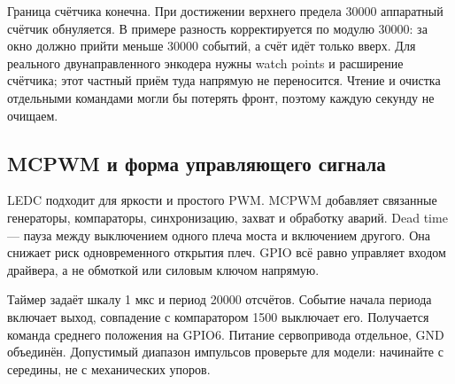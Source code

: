 
Граница счётчика конечна. При достижении верхнего предела 30000 аппаратный счётчик
обнуляется. В примере разность корректируется по модулю 30000: за окно должно прийти меньше
30000 событий, а счёт идёт только вверх. Для реального двунаправленного энкодера нужны
watch points и расширение счётчика; этот частный приём туда напрямую не переносится.
Чтение и очистка отдельными командами могли бы потерять фронт, поэтому каждую секунду не очищаем.

\subsection{MCPWM и форма управляющего сигнала}
LEDC подходит для яркости и простого PWM. MCPWM добавляет связанные генераторы,
компараторы, синхронизацию, захват и обработку аварий. Dead time --- пауза между выключением
одного плеча моста и включением другого. Она снижает риск одновременного открытия плеч.
GPIO всё равно управляет входом драйвера, а не обмоткой или силовым ключом напрямую.


Таймер задаёт шкалу 1 мкс и период 20000 отсчётов. Событие начала периода включает выход,
совпадение с компаратором 1500 выключает его. Получается команда среднего положения
на GPIO6. Питание сервопривода отдельное, GND объединён. Допустимый диапазон импульсов
проверьте для модели: начинайте с середины, не с механических упоров.

